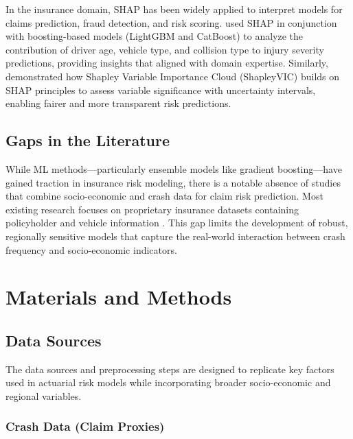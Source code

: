 \documentclass[
  number,
  review,
  3p]{elsarticle}
\begin{document}
In the insurance domain, SHAP has been widely applied to interpret
models for claims prediction, fraud detection, and risk scoring.
\citet{dong} used SHAP in conjunction with boosting-based models
(LightGBM and CatBoost) to analyze the contribution of driver age,
vehicle type, and collision type to injury severity predictions,
providing insights that aligned with domain expertise. Similarly,
\citet{ning} demonstrated how Shapley Variable Importance Cloud
(ShapleyVIC) builds on SHAP principles to assess variable significance
with uncertainty intervals, enabling fairer and more transparent risk
predictions.

\subsection{\texorpdfstring{\textbf{Gaps in the
Literature}}{Gaps in the Literature}}\label{gaps-in-the-literature}

While ML methods---particularly ensemble models like gradient
boosting---have gained traction in insurance risk modeling, there is a
notable absence of studies that combine socio-economic and crash data
for claim risk prediction. Most existing research focuses on proprietary
insurance datasets containing policyholder and vehicle information
\citep{clemente, henckaerts, jonkheijm}. This gap limits the development
of robust, regionally sensitive models that capture the real-world
interaction between crash frequency and socio-economic indicators.

\section{Materials and Methods}\label{sec-methods}

\subsection{\texorpdfstring{\textbf{Data
Sources}}{Data Sources}}\label{data-sources}

The data sources and preprocessing steps are designed to replicate key
factors used in actuarial risk models while incorporating broader
socio-economic and regional variables.

\subsubsection{\texorpdfstring{\textbf{Crash Data (Claim
Proxies)}}{Crash Data (Claim Proxies)}}\label{crash-data-claim-proxies}
\end{document}
